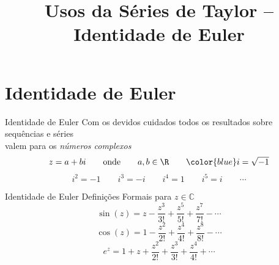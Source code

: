 \documentclass[fleqn,utf8,aspectratio=169,12pt]{beamer}
\title{Usos da Séries de Taylor -- Identidade de Euler}
\begin{document}
\addtitle

\section{Identidade de Euler}

\begin{frame}{Identidade de Euler}
  Com os devidos cuidados todos os resultados sobre sequências e séries\\
  valem para os \emph{números complexos}
  \vspace{\baselineskip}
  \[
    z = a + bi \qquad \text{onde} \qquad a, b \in \R \qquad {\color{blue}i=\sqrt{-1}}
  \]
  \pause
  \vspace{0.5\baselineskip}
  \[
    i^2 = -1 \qquad i^3 = -i \qquad i^4 = 1 \qquad i^5 = i \qquad \cdots
  \]
\end{frame}

\begin{frame}{Identidade de Euler}
Definições Formais para $z\in\mathbb{C}$
\pause
\[
  \sin(z) = z - \frac{z^3}{3!} + \frac{z^5}{5!} + \frac{z^7}{7!} - \cdots
\]
\pause
\[
  \cos(z) = 1 - \frac{z^2}{2!} + \frac{z^4}{4!} + \frac{z^8}{8!} - \cdots
\]
\pause
\[
  e^z = 1 + z + \frac{z^2}{2!} + \frac{z^3}{3!} + \frac{z^4}{4!} +  \cdots
\]
\end{frame}
\end{document}
